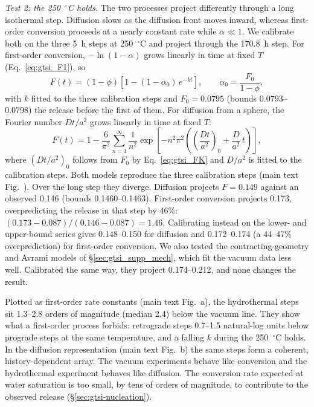 \textit{Test 2: the 250~$^\circ$C holds.} The two processes project differently through a long
isothermal step. Diffusion slows as the diffusion front moves inward, whereas first-order
conversion proceeds at a nearly constant rate while $\alpha\ll1$. We calibrate both on the three
5~h steps at 250~$^\circ$C and project through the 170.8~h step. For first-order conversion,
$-\ln(1-\alpha)$ grows linearly in time at fixed $T$ (Eq.~\eqref{eq:gtsi_F1}), so
\begin{equation}
  F(t) = (1-\phi)\left[1-(1-\alpha_0)\,e^{-kt}\right],
  \qquad \alpha_0 = \frac{F_0}{1-\phi},
\end{equation}
with $k$ fitted to the three calibration steps and $F_0 = 0.0795$ (bounds 0.0793--0.0798) the
release before the first of them. For diffusion from a sphere, the Fourier number $Dt/a^2$ grows
linearly in time at fixed $T$:
\begin{equation}
  F(t) = 1 - \frac{6}{\pi^2}\sum_{n=1}^{\infty}\frac{1}{n^2}
  \exp\!\left[-n^2\pi^2\left(\left(\frac{Dt}{a^2}\right)_0 + \frac{D}{a^2}\,t\right)\right],
\end{equation}
where $(Dt/a^2)_0$ follows from $F_0$ by Eq.~\eqref{eq:gtsi_FK} and $D/a^2$ is fitted to the
calibration steps. Both models reproduce the three calibration steps (main text Fig.~\MainFigGtHold{}).
Over the long step they diverge. Diffusion projects $F = 0.149$ against an observed 0.146
(bounds 0.1460--0.1463). First-order conversion projects 0.173, overpredicting the release in
that step by 46\%: $(0.173-0.087)/(0.146-0.087) = 1.46$. Calibrating instead on the lower- and
upper-bound series gives 0.148--0.150 for diffusion and 0.172--0.174 (a 44--47\%
overprediction) for first-order conversion. We also tested the contracting-geometry and Avrami
models of \S\ref{sec:gtsi_supp_mech}, which fit the vacuum data less well. Calibrated the same
way, they project 0.174--0.212, and none changes the result.

Plotted as first-order rate constants (main text Fig.~\MainFigGtArrhenius{}a), the hydrothermal steps sit
1.3--2.8 orders of magnitude (median 2.4) below the vacuum line. They show what a first-order
process forbids: retrograde steps 0.7--1.5 natural-log units below prograde steps at the same
temperature, and a falling $k$ during the 250~$^\circ$C holds. In the diffusion representation
(main text Fig.~\MainFigGtArrhenius{}b) the same steps form a coherent, history-dependent array. The
vacuum experiments behave like conversion and the hydrothermal experiment behaves like
diffusion. The conversion rate expected at water saturation is too small, by tens of orders
of magnitude, to contribute to the observed release (\S\ref{sec:gtsi-nucleation}).

